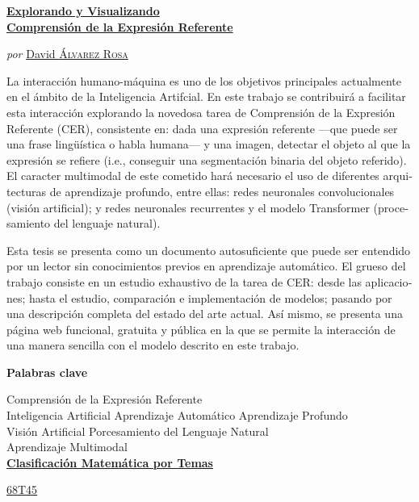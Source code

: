 \begin{otherlanguage}{spanish}
  \begin{center}
    \Large
    \href{https://recomprehension.com/}{\textbf{Explorando y Visualizando\\
        Comprensión de la Expresión Referente}}

    \vspace{2ex} \large \textit{por}
    \href{https://david.alvarezrosa.com/}{David \textsc{Álvarez Rosa}}

    \vspace{3ex} \textbf{\abstractname}
  \end{center}

  \vspace{-2ex}
  \noindent La interacción humano-máquina es uno de los objetivos principales
  actualmente en el ámbito de la Inteligencia Artifcial. En este trabajo se
  contribuirá a facilitar esta interacción explorando la novedosa tarea de
  Comprensión de la Expresión Referente (CER), consistente en: dada una
  expresión referente ---que puede ser una frase lingüística o habla humana---
  y una imagen, detectar el objeto al que la expresión se refiere (i.e.,
  conseguir una segmentación binaria del objeto referido). El caracter
  multimodal de este cometido hará necesario el uso de diferentes arquitecturas
  de aprendizaje profundo, entre ellas: redes neuronales convolucionales
  (visión artificial); y redes neuronales recurrentes y el modelo Transformer
  (procesamiento del lenguaje natural).

  Esta tesis se presenta como un documento autosuficiente que puede ser
  entendido por un lector sin conocimientos previos en aprendizaje
  automático. El grueso del trabajo consiste en un estudio exhaustivo de la
  tarea de CER: desde las aplicaciones; hasta el estudio, comparación e
  implementación de modelos; pasando por una descripción completa del estado
  del arte actual. Así mismo, se presenta una página web funcional, gratuita y
  pública en la que se permite la interacción de una manera sencilla con el
  modelo descrito en este trabajo.

  \begin{center}


    \bigskip\smallskip \textbf{Palabras clave}

    Comprensión de la Expresión Referente\\
    Inteligencia Artificial \textbullet{} Aprendizaje Automático \textbullet{}
    Aprendizaje Profundo\\
    Visión Artificial \textbullet{} Porcesamiento del Lenguaje Natural\\
    Aprendizaje Multimodal\\

    \bigskip
    \href{https://mathscinet.ams.org/msc/msc2010.html}{\textbf{Clasificación
        Matemática por Temas}}

    \href{https://mathscinet.ams.org/msc/msc2010.html?t=68Txx}{68T45}
  \end{center}
\end{otherlanguage}
\vfill\null{}


